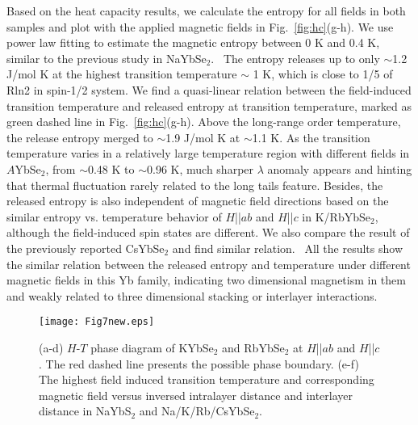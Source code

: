 \documentclass[%
 aip,
 amsmath,amssymb,
 reprint,%
]{revtex4-1}
\begin{document}
Based on the heat capacity results, we calculate the entropy for all fields in both samples and plot with the applied magnetic fields in Fig.~\ref{fig:hc}(g-h). We use power law fitting to estimate the magnetic entropy between 0 K and 0.4 K, similar to the previous study in NaYbSe$_2$.~\cite{Ranjith2019naybse} The entropy releases up to only $\sim$1.2 J/mol K at the highest transition temperature $\sim$ 1 K, which is close to 1/5 of Rln2 in spin-1/2 system. We find a quasi-linear relation between the field-induced transition temperature and released entropy at transition temperature, marked as green dashed line in Fig.~\ref{fig:hc}(g-h). Above the long-range order temperature, the release entropy merged to $\sim$1.9 J/mol K at $\sim$1.1 K. As the transition temperature varies in a relatively large temperature region with different fields in $A$YbSe$_2$, from $\sim$0.48 K to $\sim$0.96 K, much sharper $\lambda$ anomaly appears and hinting that thermal fluctuation rarely related to the long tails feature. Besides, the released entropy is also independent of magnetic field directions based on the similar entropy vs. temperature behavior of $H$||$ab$ and $H$||$c$ in K/RbYbSe$_2$, although the field-induced spin states are different. We also compare the result of the previously reported CsYbSe$_2$ and find similar relation.~\cite{PhysRevB.100.220407} All the results show the similar relation between the released entropy and temperature under different magnetic fields in this Yb family, indicating two dimensional magnetism in them and weakly related to three dimensional stacking or interlayer interactions.
 

\begin{figure}[tbh]
\texttt{[image: Fig7new.eps]}
\caption {\label{fig:pd}(a-d) $H$-$T$ phase diagram of KYbSe$_2$ and RbYbSe$_2$ at $H$||$ab$ and $H$||$c$. The red dashed line presents the possible phase boundary. (e-f) The highest field induced transition temperature and corresponding magnetic field versus inversed intralayer distance and interlayer distance in NaYbS$_2$ and Na/K/Rb/CsYbSe$_2$.}
\label{crystal}
\end{figure}
\end{document}
